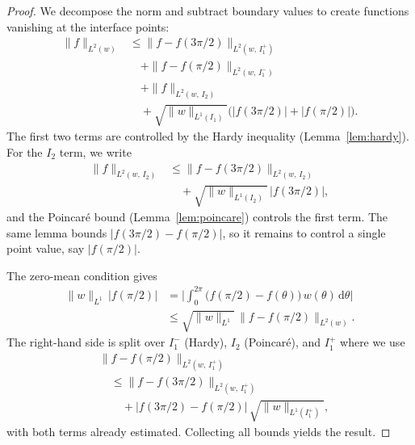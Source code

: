 \documentclass[10pt,a4paper]{amsart}
\begin{document}
\begin{proof}
We decompose the norm and subtract boundary values to create functions vanishing at the interface points:
\begin{align}
    \|f\|_{L^2(w)} &\leq \|f - f(3\pi/2)\|_{L^2(w,\,I_1^+)} \nonumber\\
    &\quad + \|f - f(\pi/2)\|_{L^2(w,\,I_1^-)} \nonumber\\
    &\quad + \|f\|_{L^2(w,\,I_2)} \nonumber\\
    &\quad + \sqrt{\|w\|_{L^1(I_1)}}\big(|f(3\pi/2)| + |f(\pi/2)|\big).
\end{align}
The first two terms are controlled by the Hardy inequality (Lemma~\ref{lem:hardy}). For the $I_2$ term, we write
\begin{align}
    \|f\|_{L^2(w,\,I_2)} &\leq \|f - f(3\pi/2)\|_{L^2(w,\,I_2)} \nonumber\\
    &\quad + \sqrt{\|w\|_{L^1(I_2)}}\,|f(3\pi/2)|,
\end{align}
and the Poincar\'{e} bound (Lemma~\ref{lem:poincare}) controls the first term. The same lemma bounds $|f(3\pi/2) - f(\pi/2)|$, so it remains to control a single point value, say $|f(\pi/2)|$.

The zero-mean condition gives
\begin{align}
    \|w\|_{L^1}\,|f(\pi/2)| &= \Big|\int_0^{2\pi}\big(f(\pi/2) - f(\theta)\big)\, w(\theta)\, \mathrm{d}\theta\Big| \nonumber\\
    &\leq \sqrt{\|w\|_{L^1}}\,\|f - f(\pi/2)\|_{L^2(w)}.
\end{align}
The right-hand side is split over $I_1^-$ (Hardy), $I_2$ (Poincar\'{e}), and $I_1^+$ where we use
\begin{align}
    &\|f - f(\pi/2)\|_{L^2(w,\,I_1^+)} \nonumber\\
    &\quad \leq \|f - f(3\pi/2)\|_{L^2(w,\,I_1^+)} \nonumber\\
    &\quad\quad + |f(3\pi/2) - f(\pi/2)|\,\sqrt{\|w\|_{L^1(I_1^+)}},
\end{align}
with both terms already estimated. Collecting all bounds yields the result.
\end{proof}
\end{document}
